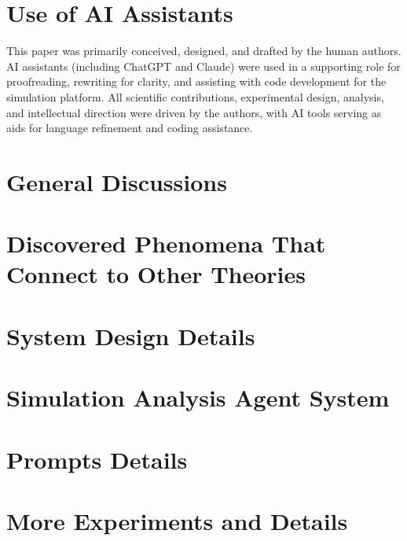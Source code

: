 \documentclass[11pt]{article}
\begin{document}
\section*{Use of AI Assistants}
This paper was primarily conceived, designed, and drafted by the human authors. AI assistants (including ChatGPT and Claude) were used in a supporting role for proofreading, rewriting for clarity, and assisting with code development for the simulation platform. All scientific contributions, experimental design, analysis, and intellectual direction were driven by the authors, with AI tools serving as aids for language refinement and coding assistance.

%



\appendix

\section{General Discussions}
\label{app:general_discussions}


\section{Discovered Phenomena That Connect to Other Theories}
\label{app:other_theories}


\section{System Design Details}
\label{app:system_agent_design}


\section{Simulation Analysis Agent System}
\label{app:simulation_analysis}


\section{Prompts Details}
\label{app:prompts}


\section{More Experiments and Details}
\label{app:experiments}

\end{document}

